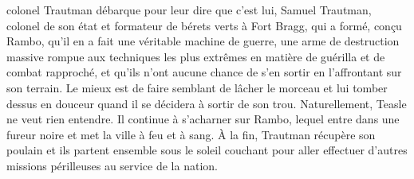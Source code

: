 colonel Trautman débarque pour leur dire que c’est lui, Samuel Trautman, colonel de son état et formateur de bérets verts à Fort Bragg, qui a formé, conçu Rambo, qu’il en a fait une véritable machine de guerre, une arme de destruction massive rompue aux techniques les plus extrêmes en matière de guérilla et de combat rapproché, et qu’ils n’ont aucune chance de s’en sortir en l’affrontant sur son terrain. Le mieux est de faire semblant de lâcher le morceau et lui tomber dessus en douceur quand il se décidera à sortir de son trou. Naturellement, Teasle ne veut rien entendre. Il continue à s’acharner sur Rambo, lequel entre dans une fureur noire et met la ville à feu et à sang. À la fin, Trautman récupère son poulain et ils partent ensemble sous le soleil couchant pour aller effectuer d’autres missions périlleuses au service de la nation. 



